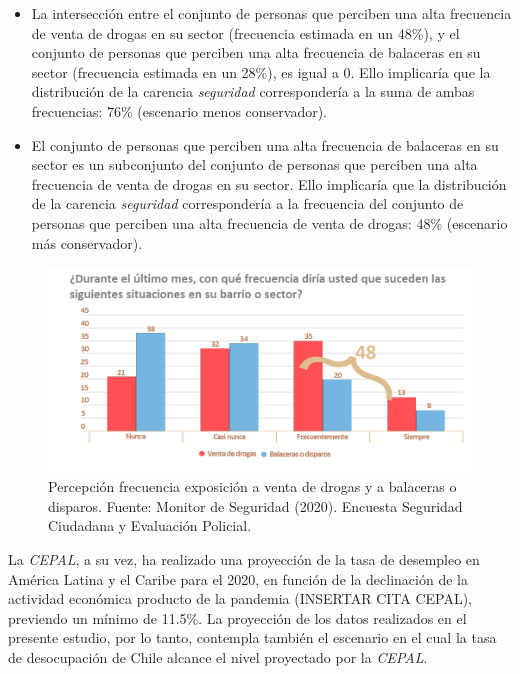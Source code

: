 \documentclass[12pt,letterpaper,spanish]{article}
\begin{document}
\begin{itemize}
    
    \item La intersección entre el conjunto de personas que perciben una alta frecuencia de venta de drogas en su sector (frecuencia estimada en un 48\%), y el conjunto de personas que perciben una alta frecuencia de balaceras en su sector (frecuencia estimada en un 28\%), es igual a 0. Ello implicaría que la distribución de la carencia \textit{seguridad} correspondería a la suma de ambas frecuencias: 76\% (escenario menos conservador). 
    

    \item El conjunto de personas que perciben una alta frecuencia de balaceras en su sector es un subconjunto del conjunto de personas que perciben una alta frecuencia de venta de drogas en su sector. Ello implicaría que la distribución de la carencia \textit{seguridad} correspondería a la frecuencia del conjunto de personas que perciben una alta frecuencia de venta de drogas: 48\% (escenario más conservador).
    
    \end{itemize}




\begin{figure}[H]
    \centering
    \includegraphics[width=\textwidth]{Max/monitor_seguridad_2.png}
    \caption{Percepción frecuencia exposición a venta de drogas y a balaceras o disparos. Fuente: Monitor de Seguridad (2020). Encuesta Seguridad Ciudadana y Evaluación Policial.}
    \label{monitor}
\end{figure}




La \textit{CEPAL}, a su vez, ha realizado una proyección de la tasa de desempleo en América Latina y el Caribe para el 2020, en función de la declinación de la actividad económica producto de la pandemia (INSERTAR CITA CEPAL), previendo un mínimo de 11.5\%. La proyección de los datos realizados en el presente estudio, por lo tanto, contempla también el escenario en el cual la tasa de desocupación de Chile alcance el nivel proyectado por la \textit{CEPAL}.
\end{document}

